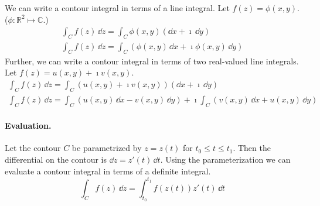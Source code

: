 We can write a contour integral in terms of a line integral.
Let $f(z) = \phi(x,y)$.  ($\phi : \mathbb{R}^2 \mapsto \mathbb{C}$.)
\begin{gather}
  \nonumber
  \int_C f(z) \,\dd z = \int_C \phi(x,y) (\dd x + \imath \,\dd y) 
  \\
  \int_C f(z) \,\dd z = \int_C (\phi(x,y)\,\dd x + \imath \phi(x,y)\,\dd y)  
  \label{eqn comp line int line int}
\end{gather}
Further, we can write a contour integral in terms of two real-valued 
line integrals.  Let $f(z) = u(x,y) + \imath v(x,y)$.
\begin{gather}
  \nonumber
  \int_C f(z) \,\dd z = \int_C (u(x,y) + \imath v(x,y)) (\dd x + \imath \,\dd y) 
  \\
  \int_C f(z) \,\dd z = \int_C (u(x,y)\,\dd x - v(x,y)\,\dd y)  
  + \imath \int_C (v(x,y)\,\dd x + u(x,y)\,\dd y)
  \label{comp_line_int_real_line_int}
\end{gather}




\paragraph{Evaluation.}
Let the contour $C$ be parametrized by $z = z(t)$ for 
$t_0 \leq t \leq t_1$.  Then the differential on the contour is
$\dd z = z'(t)\,\dd t$.
Using the parameterization we can evaluate a contour integral in terms of 
a definite integral.
\[
\int_C f(z) \,\dd z
= \int_{t_0}^{t_1} f(z(t)) z'(t)\,\dd t
\]










